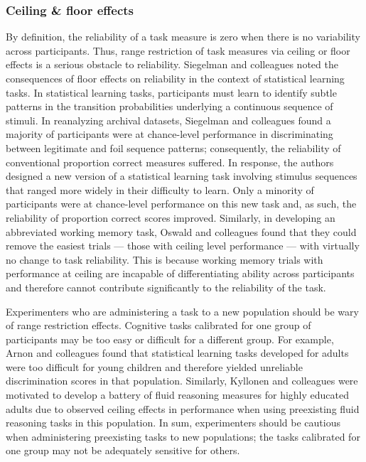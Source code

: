 \documentclass[a4paper,notitlepage,12pt]{article}
\begin{document}
\subsubsection{Ceiling \& floor effects}

By definition, the reliability of a task measure is zero when there is no variability across participants. Thus, range restriction of task measures via ceiling or floor effects is a serious obstacle to reliability. Siegelman and colleagues \cite{siegelman2017measuring} noted the consequences of floor effects on reliability in the context of statistical learning tasks. In statistical learning tasks, participants must learn to identify subtle patterns in the transition probabilities underlying a continuous sequence of stimuli. In reanalyzing archival datasets, Siegelman and colleagues found a majority of participants were at chance-level performance in discriminating between legitimate and foil sequence patterns; consequently, the reliability of conventional proportion correct measures suffered. In response, the authors designed a new version of a statistical learning task involving stimulus sequences that ranged more widely in their difficulty to learn. Only a minority of participants were at chance-level performance on this new task and, as such, the reliability of proportion correct scores improved. Similarly, in developing an abbreviated working memory task, Oswald and colleagues \cite{oswald2015development} found that they could remove the easiest trials --- those with ceiling level performance --- with virtually no change to task reliability. This is because working memory trials with performance at ceiling are incapable of differentiating ability across participants and therefore cannot contribute significantly to the reliability of the task.

Experimenters who are administering a task to a new population should be wary of range restriction effects. Cognitive tasks calibrated for one group of participants may be too easy or difficult for a different group. For example, Arnon and colleagues \cite{arnon2020current} found that statistical learning tasks developed for adults were too difficult for young children and therefore yielded unreliable discrimination scores in that population. Similarly, Kyllonen and colleagues \cite{kyllonen2019general} were motivated to develop a battery of fluid reasoning measures for highly educated adults due to observed ceiling effects in performance when using preexisting fluid reasoning tasks in this population. In sum, experimenters should be cautious when administering preexisting tasks to new populations; the tasks calibrated for one group may not be adequately sensitive for others.  
\end{document}
